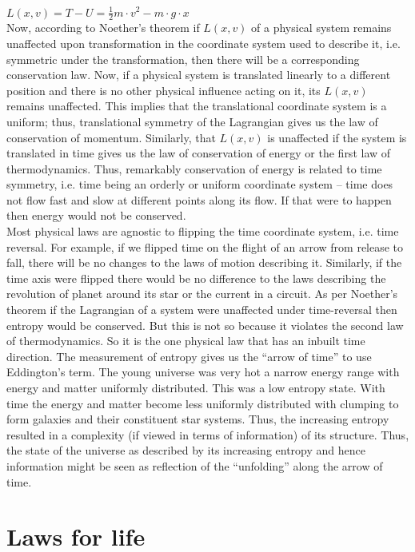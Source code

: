 \documentclass[11pt]{article} %
\numberwithin{equation}{section}
\begin{document}
  $L(x,v)=T-U=\tfrac{1}{2}m \cdot v^2-m\cdot g \cdot x$\\

Now, according to Noether’s theorem if $L(x,v)$ of a physical system remains unaffected upon transformation in the coordinate system used to describe it, i.e. symmetric under the transformation, then there will be a corresponding conservation law. Now, if a physical system is translated linearly to a different position and there is no other physical influence acting on it, its  $L(x,v)$ remains unaffected. This implies that the translational coordinate system is a uniform; thus, translational symmetry of the Lagrangian gives us the law of conservation of momentum. Similarly, that $L(x,v)$ is unaffected if the system is translated in time gives us the law of conservation of energy or the first law of thermodynamics. Thus, remarkably conservation of energy is related to time symmetry, i.e. time being an orderly or uniform coordinate system -- time does not flow fast and slow at different points along its flow. If that were to happen then energy would not be conserved.\\

Most physical laws are agnostic to flipping the time coordinate system, i.e. time reversal. For example, if we flipped time on the flight of an arrow from release to fall, there will be no changes to the laws of motion describing it. Similarly, if the time axis were flipped there would be no difference to the laws describing the revolution of planet around its star or the current in a circuit. As per Noether’s theorem if the Lagrangian of a system were unaffected under time-reversal then entropy would be conserved. But this is not so because it violates the second law of thermodynamics. So  it is the one physical law that has an inbuilt time direction. The measurement of entropy gives us the “arrow of time” to use Eddington’s term. The young universe was very hot a narrow energy range with energy and matter uniformly distributed. This was a low entropy state. With time the energy and matter become less uniformly distributed with clumping to form galaxies and their constituent star systems. Thus, the increasing entropy resulted in a complexity (if viewed in terms of information) of its structure. Thus, the state of the universe as described by its increasing entropy and hence information might be seen as reflection of the “unfolding” along the arrow of time.

\section{Laws for life}
\end{document}
